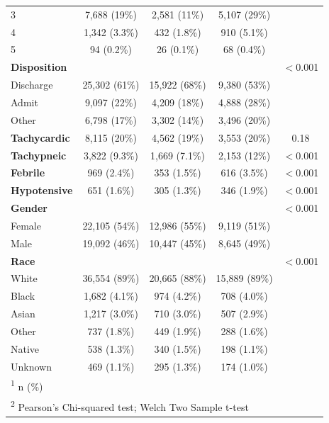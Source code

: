 \documentclass[,,nonblindrev]{informs}
\begin{document}
\begin{table}[htbp]
\begin{tabular}{lcccc}
\hspace{0.5cm} 3 & 7,688 (19\%) & 2,581 (11\%) & 5,107 (29\%) & \\
\hspace{0.5cm} 4 & 1,342 (3.3\%) & 432 (1.8\%) & 910 (5.1\%) & \\
\hspace{0.5cm} 5 & 94 (0.2\%) & 26 (0.1\%) & 68 (0.4\%) & \\
\hline
\textbf{Disposition} & & & & $<$0.001 \\
\hspace{0.5cm} Discharge & 25,302 (61\%) & 15,922 (68\%) & 9,380 (53\%) & \\
\hspace{0.5cm} Admit & 9,097 (22\%) & 4,209 (18\%) & 4,888 (28\%) & \\
\hspace{0.5cm} Other & 6,798 (17\%) & 3,302 (14\%) & 3,496 (20\%) & \\
\hline
\textbf{Tachycardic} & 8,115 (20\%) & 4,562 (19\%) & 3,553 (20\%) & 0.18 \\
\hline
\textbf{Tachypneic} & 3,822 (9.3\%) & 1,669 (7.1\%) & 2,153 (12\%) & $<$0.001 \\
\hline
\textbf{Febrile} & 969 (2.4\%) & 353 (1.5\%) & 616 (3.5\%) & $<$0.001 \\
\hline
\textbf{Hypotensive} & 651 (1.6\%) & 305 (1.3\%) & 346 (1.9\%) & $<$0.001 \\
\hline
\textbf{Gender} & & & & $<$0.001 \\
\hspace{0.5cm} Female & 22,105 (54\%) & 12,986 (55\%) & 9,119 (51\%) & \\
\hspace{0.5cm} Male & 19,092 (46\%) & 10,447 (45\%) & 8,645 (49\%) & \\
\hline
\textbf{Race} & & & & $<$0.001 \\
\hspace{0.5cm} White & 36,554 (89\%) & 20,665 (88\%) & 15,889 (89\%) & \\
\hspace{0.5cm} Black & 1,682 (4.1\%) & 974 (4.2\%) & 708 (4.0\%) & \\
\hspace{0.5cm} Asian & 1,217 (3.0\%) & 710 (3.0\%) & 507 (2.9\%) & \\
\hspace{0.5cm} Other & 737 (1.8\%) & 449 (1.9\%) & 288 (1.6\%) & \\
\hspace{0.5cm} Native & 538 (1.3\%) & 340 (1.5\%) & 198 (1.1\%) & \\
\hspace{0.5cm} Unknown & 469 (1.1\%) & 295 (1.3\%) & 174 (1.0\%) & \\
\hline
\hline
\multicolumn{5}{l}{\textsuperscript{1} n (\%)} \\
\multicolumn{5}{l}{\textsuperscript{2} Pearson's Chi-squared test; Welch Two Sample t-test} \\
\end{tabular}
\end{table}
\end{document}
